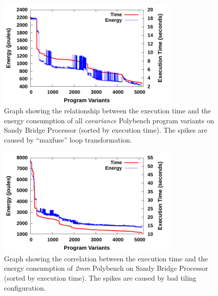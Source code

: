 

\begin{figure}[bt]
    \includegraphics[width=3.5in]{Covariance}
    \caption{Graph showing the relationship between the execution time and the
energy consumption of all \emph{covariance} Polybench program variants on Sandy 
Bridge Processor (sorted by execution time). The spikes are caused by ``maxfuse''
loop transformation.}
    \label{fig:TE}
\end{figure}

\begin{figure}[bt]
    \includegraphics[width=3.5in]{2mm}
    \caption{Graph showing the correlation between the execution time and the
energy consumption of \emph{2mm} Polybench on Sandy Bridge Processor (sorted by execution time).
The spikes are caused by bad tiling configuration.}
    \label{fig:2mm-TE}
\end{figure}

